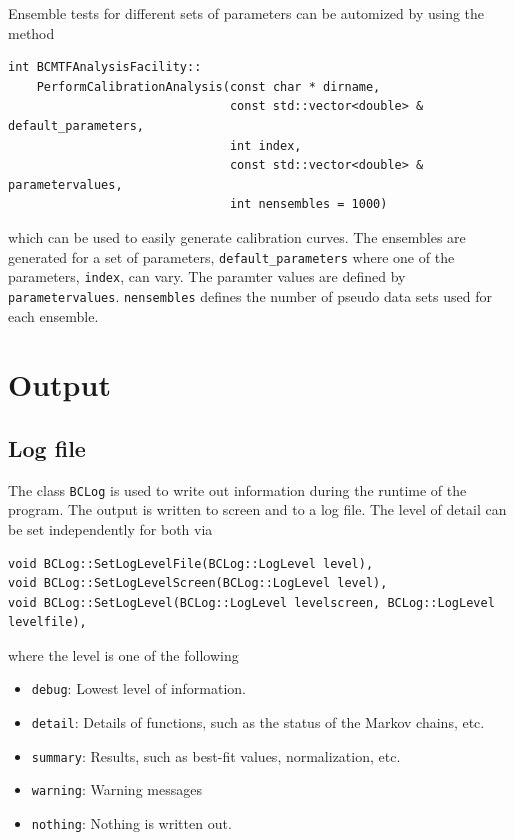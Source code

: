 \documentclass[11pt, a4paper]{article}
\begin{document}
Ensemble tests for different sets of parameters can be automized by
using the method
%
\begin{verbatim}
int BCMTFAnalysisFacility::
    PerformCalibrationAnalysis(const char * dirname,
                               const std::vector<double> & default_parameters,
                               int index,
                               const std::vector<double> & parametervalues,
                               int nensembles = 1000)
\end{verbatim}
%
which can be used to easily generate calibration curves. The ensembles
are generated for a set of parameters, \verb|default_parameters| where
one of the parameters, \verb|index|, can vary. The paramter values are
defined by \verb|parametervalues|. \verb|nensembles| defines the
number of pseudo data sets used for each ensemble.




\clearpage
\pagebreak

\section{Output}
\label{section:output}

\subsection{Log file}
\label{subsection:logfile}

The class \verb|BCLog| is used to write out information during the
runtime of the program. The output is written to screen and to a log
file. The level of detail can be set independently for both
via
%
\begin{verbatim}
void BCLog::SetLogLevelFile(BCLog::LogLevel level),
void BCLog::SetLogLevelScreen(BCLog::LogLevel level),
void BCLog::SetLogLevel(BCLog::LogLevel levelscreen, BCLog::LogLevel levelfile),
\end{verbatim}
%
where the level is one of the following
%
\begin{itemize}
\item \verb|debug|: Lowest level of information.
\item \verb|detail|: Details of functions, such as the status of the
  Markov chains, etc.
\item \verb|summary|: Results, such as best-fit values, normalization, etc.
\item \verb|warning|: Warning messages
\item \verb|nothing|: Nothing is written out.
\end{itemize}
\end{document}

